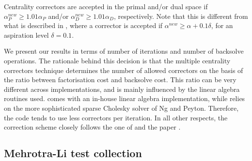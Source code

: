 Centrality correctors are accepted in the primal and/or dual space
if ${\alpha}_{P}^{new} \geq 1.01 \alpha_{P}$ 
and/or ${\alpha}_{D}^{new} \geq 1.01 \alpha_{D}$, respectively.
Note that this is different from what is described in \cite{Gondzio96}, where
a corrector is accepted if ${\alpha}^{new} \geq \alpha + 0.1\delta$, 
for an aspiration level $\delta = 0.1$.

We present our results in terms of number of iterations and number 
of backsolve operations. The rationale behind this decision is that 
the multiple centrality correctors technique determines the number 
of allowed correctors on the basis of the ratio between factorisation 
cost and backsolve cost. This ratio can be very different across 
implementations, and is mainly influenced by the linear algebra 
routines used. 
\HOPDM comes with an in-house linear algebra implementation, while
\PCx relies on the more sophisticated sparse Cholesky solver
of Ng and Peyton. Therefore, the \PCx code tends to use less 
correctors per iteration.
In all other respects, the correction scheme closely follows the one
of \HOPDM and the paper \cite{Gondzio96}.

%
%
\subsection{Mehrotra-Li test collection}
\label{ML-tests}

